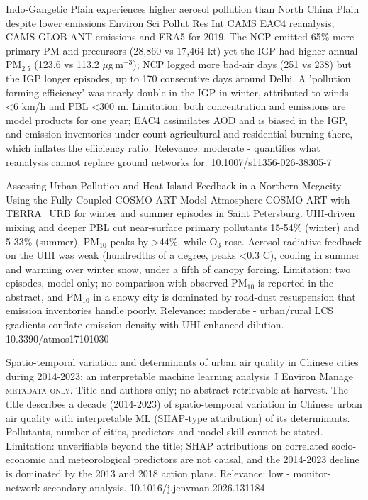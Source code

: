 \documentclass[10pt]{article}
\begin{document}
{Indo-Gangetic Plain experiences higher aerosol pollution than North China Plain despite lower emissions}
{Environ Sci Pollut Res Int}
{CAMS EAC4 reanalysis, CAMS-GLOB-ANT emissions and ERA5 for 2019. The NCP emitted 65\% more primary PM and precursors (28,860 vs 17,464 kt) yet the IGP had higher annual PM$_{2.5}$ (123.6 vs 113.2 $\mu$g\,m$^{-3}$); NCP logged more bad-air days (251 vs 238) but the IGP longer episodes, up to 170 consecutive days around Delhi. A 'pollution forming efficiency' was nearly double in the IGP in winter, attributed to winds <6 km/h and PBL <300 m. Limitation: both concentration and emissions are model products for one year; EAC4 assimilates AOD and is biased in the IGP, and emission inventories under-count agricultural and residential burning there, which inflates the efficiency ratio. Relevance: moderate - quantifies what reanalysis cannot replace ground networks for.}
{10.1007/s11356-026-38305-7}

{Assessing Urban Pollution and Heat Island Feedback in a Northern Megacity Using the Fully Coupled COSMO-ART Model}
{Atmosphere}
{COSMO-ART with TERRA\_URB for winter and summer episodes in Saint Petersburg. UHI-driven mixing and deeper PBL cut near-surface primary pollutants 15-54\% (winter) and 5-33\% (summer), PM$_{10}$ peaks by >44\%, while O$_3$ rose. Aerosol radiative feedback on the UHI was weak (hundredths of a degree, peaks <0.3 C), cooling in summer and warming over winter snow, under a fifth of canopy forcing. Limitation: two episodes, model-only; no comparison with observed PM$_{10}$ is reported in the abstract, and PM$_{10}$ in a snowy city is dominated by road-dust resuspension that emission inventories handle poorly. Relevance: moderate - urban/rural LCS gradients conflate emission density with UHI-enhanced dilution.}
{10.3390/atmos17101030}

{Spatio-temporal variation and determinants of urban air quality in Chinese cities during 2014-2023: an interpretable machine learning analysis}
{J Environ Manage}
{\textsc{metadata only.} Title and authors only; no abstract retrievable at harvest. The title describes a decade (2014-2023) of spatio-temporal variation in Chinese urban air quality with interpretable ML (SHAP-type attribution) of its determinants. Pollutants, number of cities, predictors and model skill cannot be stated. Limitation: unverifiable beyond the title; SHAP attributions on correlated socio-economic and meteorological predictors are not causal, and the 2014-2023 decline is dominated by the 2013 and 2018 action plans. Relevance: low - monitor-network secondary analysis.}
{10.1016/j.jenvman.2026.131184}
\end{document}
